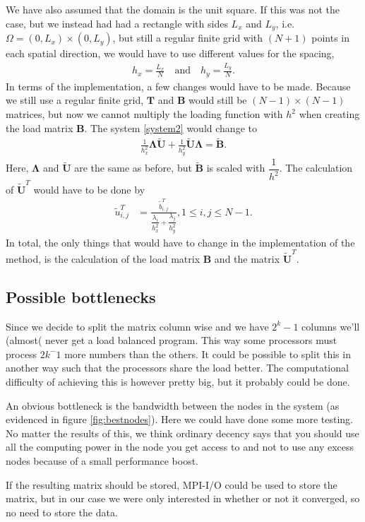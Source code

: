 We have also assumed that the domain is the unit square. If this was not the case, but we instead had had a rectangle with sides $L_x$ and $L_y$, i.e. $ \Omega = (0,L_x)\times (0,L_y)$, but still a regular finite grid with $(N+1)$ points in each spatial direction, we would have to use different values for the spacing, 
\begin{align*}
	h_x = \frac{L_x}{N} \quad \text{and} \quad h_y = \frac{L_y}{N}.
\end{align*}
In terms of the implementation, a few changes would have to be made. Because we still use a regular finite grid, $\mathbf{T}$ and $\mathbf{B}$ would still be $(N-1)\times (N-1)$ matrices, but now we cannot multiply the loading function with $h^2$ when creating the load matrix $\mathbf{B}$. The system \eqref{system2} would change to 
\begin{align*}
	\frac{1}{h_x^2}\mathbf{\Lambda\widetilde{U}} + \frac{1}{h_y^2}\mathbf{\widetilde{U}\Lambda} = \mathbf{\widetilde{B}}.
\end{align*}
Here, $\mathbf{\Lambda}$ and $\mathbf{\widetilde{U}}$ are the same as before, but $\mathbf{\widetilde{B}}$ is scaled with $\dfrac{1}{h^2}$. The calculation of $\mathbf{\widetilde{U}}^T$ would have to be done by
\begin{align*}
	\tilde{u}^T_{i,j} &= \frac{\tilde{b}^T_{i,j}}{\dfrac{\lambda_i}{h_x^2} + \dfrac{\lambda_j}{h_y^2}}, 1 \leq i, j \leq N-1.
\end{align*}
In total, the only things that would have to change in the implementation of the method, is the calculation of the load matrix $\mathbf{B}$ and the matrix $\mathbf{\widetilde{U}}^T$.

\subsection*{Possible bottlenecks}
Since we decide to split the matrix column wise and we have $2^k-1$ columns we'll (almost( never get a load balanced program. This way some processors must process $2k^-1$ more numbers than the others. It could be possible to split this in another way such that the processors share the load better. The computational difficulty of achieving this is however pretty big, but it probably could be done.

An obvious bottleneck is the bandwidth between the nodes in the system (as evidenced in figure \ref{fig:bestnodes}). Here we could have done some more testing. No matter the results of this, we think ordinary decency says that you should use all the computing power in the node you get access to and not to use any excess nodes because of a small performance boost.

If the resulting matrix should be stored, MPI-I/O could be used to store the matrix, but in our case we were only interested in whether or not it converged, so no need to store the data.
